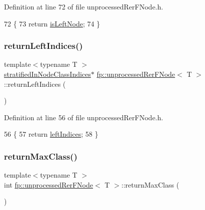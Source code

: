 Definition at line 72 of file unprocessed\+Rer\+F\+Node.\+h.


\begin{DoxyCode}
72                                               \{
73                     \textcolor{keywordflow}{return} \hyperlink{classfp_1_1unprocessedRerFNode_a75fe4b426a6a1cc8bb1de50380dcec94}{isLeftNode};
74                 \}
\end{DoxyCode}
\mbox{\label{classfp_1_1unprocessedRerFNode_a49c123f04f9c961e8d6142aa11200bcd}} 
\subsubsection{\texorpdfstring{return\+Left\+Indices()}{returnLeftIndices()}}
{\footnotesize\ttfamily template$<$typename T $>$ \\
\hyperlink{classfp_1_1stratifiedInNodeClassIndices}{stratified\+In\+Node\+Class\+Indices}$\ast$ \hyperlink{classfp_1_1unprocessedRerFNode}{fp\+::unprocessed\+Rer\+F\+Node}$<$ T $>$\+::return\+Left\+Indices (\begin{DoxyParamCaption}{ }\end{DoxyParamCaption})\hspace{0.3cm}{\ttfamily [inline]}}



Definition at line 56 of file unprocessed\+Rer\+F\+Node.\+h.


\begin{DoxyCode}
56                                                                         \{
57                     \textcolor{keywordflow}{return} \hyperlink{classfp_1_1unprocessedRerFNode_ae402805c487d29fa6d0b8fb6f873a4d3}{leftIndices};
58                 \}
\end{DoxyCode}
\mbox{\label{classfp_1_1unprocessedRerFNode_a656fca7854eae97dae1b93082d703606}} 
\subsubsection{\texorpdfstring{return\+Max\+Class()}{returnMaxClass()}}
{\footnotesize\ttfamily template$<$typename T $>$ \\
int \hyperlink{classfp_1_1unprocessedRerFNode}{fp\+::unprocessed\+Rer\+F\+Node}$<$ T $>$\+::return\+Max\+Class (\begin{DoxyParamCaption}{ }\end{DoxyParamCaption})\hspace{0.3cm}{\ttfamily [inline]}}




